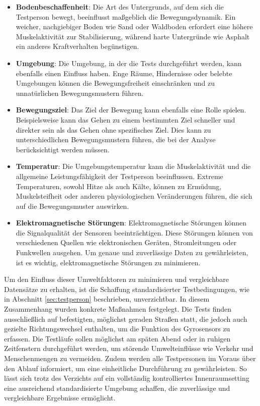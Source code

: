 \begin{itemize}
	\item \textbf{Bodenbeschaffenheit}: Die Art des Untergrunds, auf dem sich die Testperson bewegt, beeinflusst maßgeblich die Bewegungsdynamik. Ein weicher, nachgiebiger Boden wie Sand oder Waldboden erfordert eine höhere Muskelaktivität zur Stabilisierung, während harte Untergründe wie Asphalt ein anderes Kraftverhalten begünstigen.
	\item \textbf{Umgebung}: Die Umgebung, in der die Tests durchgeführt werden, kann ebenfalls einen Einfluss haben. Enge Räume, Hindernisse oder belebte Umgebungen können die Bewegungsfreiheit einschränken und zu unnatürlichen Bewegungsmustern führen.
	\item \textbf{Bewegungsziel}: Das Ziel der Bewegung kann ebenfalls eine Rolle spielen. Beispielsweise kann das Gehen zu einem bestimmten Ziel schneller und direkter sein als das Gehen ohne spezifisches Ziel. Dies kann zu unterschiedlichen Bewegungsmustern führen, die bei der Analyse berücksichtigt werden müssen.
	\item \textbf{Temperatur}: Die Umgebungstemperatur kann die Muskelaktivität und die allgemeine Leistungsfähigkeit der Testperson beeinflussen. Extreme Temperaturen, sowohl Hitze als auch Kälte, können zu Ermüdung, Muskelsteifheit oder anderen physiologischen Veränderungen führen, die sich auf die Bewegungsmuster auswirken.
	\item \textbf{Elektromagnetische Störungen}: Elektromagnetische Störungen können die Signalqualität der Sensoren beeinträchtigen. Diese Störungen können von verschiedenen Quellen wie elektronischen Geräten, Stromleitungen oder Funkwellen ausgehen. Um genaue und zuverlässige Daten zu gewährleisten, ist es wichtig, elektromagnetische Störungen zu minimieren.
\end{itemize}

Um den Einfluss dieser Umweltfaktoren zu minimieren und vergleichbare Datensätze zu erhalten, ist die Schaffung standardisierter Testbedingungen, wie in Abschnitt \ref{sec:testperson} beschrieben, unverzichtbar. In diesem Zusammenhang wurden konkrete Maßnahmen festgelegt. Die Tests finden ausschließlich auf befestigten, möglichst geraden Straßen statt, die jedoch auch gezielte Richtungswechsel enthalten, um die Funktion des Gyrosensors zu erfassen. Die Testläufe sollen möglichst am späten Abend oder in ruhigen Zeitfenstern durchgeführt werden, um störende Umwelteinflüsse wie Verkehr und Menschenmengen zu vermeiden. Zudem werden alle Testpersonen im Voraus über den Ablauf informiert, um eine einheitliche Durchführung zu gewährleisten. So lässt sich trotz des Verzichts auf ein vollständig kontrolliertes Innenraumsetting eine ausreichend standardisierte Umgebung schaffen, die zuverlässige und vergleichbare Ergebnisse ermöglicht.


